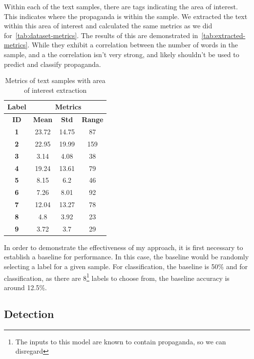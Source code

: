 \documentclass[twocolumn]{article}
\begin{document}
Within each of the text samples, there are tags indicating the area of interest. This indicates where the propaganda is within the sample. We extracted the text within this area of interest and calculated the same metrics as we did for~\autoref{tab:dataset-metrics}. The results of this are demonstrated in~\autoref{tab:extracted-metrics}. While they exhibit a correlation between the number of words in the sample, and a the correlation isn't very strong, and likely shouldn't be used to predict and classify propaganda.

\begin{table}[h]
    \centering
    \begin{tabular}{@{}cccc@{}}
        \toprule
        \multicolumn{1}{c}{\textbf{Label}} & \multicolumn{3}{c}{\textbf{Metrics}}          \\ \midrule
        \multicolumn{1}{c}{\textbf{ID}}    & \textbf{Mean} & \textbf{Std} & \textbf{Range} \\ \midrule
        \textbf{1} & 23.72 & 14.75 & 87 \\
        \textbf{2} & 22.95 & 19.99 & 159 \\
        \textbf{3} & 3.14 & 4.08 & 38 \\
        \textbf{4} & 19.24 & 13.61 & 79 \\
        \textbf{5} & 8.15 & 6.2 & 46 \\
        \textbf{6} & 7.26 & 8.01 & 92 \\
        \textbf{7} & 12.04 & 13.27 & 78 \\
        \textbf{8} & 4.8 & 3.92 & 23 \\
        \textbf{9} & 3.72 & 3.7 & 29 \\
        \bottomrule
        \end{tabular}
    \caption{Metrics of text samples with area of interest extraction}
    \label{tab:extracted-metrics}
\end{table}

In order to demonstrate the effectiveness of my approach, it is first necessary to establish a baseline for performance. In this case, the baseline would be randomly selecting a label for a given sample. For classification, the baseline is 50\% and for classification, as there are 8\footnote{The inputs to this model are known to contain propaganda, so we can disregard} labels to choose from, the baseline accuracy is around 12.5\%. 

\subsection{Detection}
\end{document}
